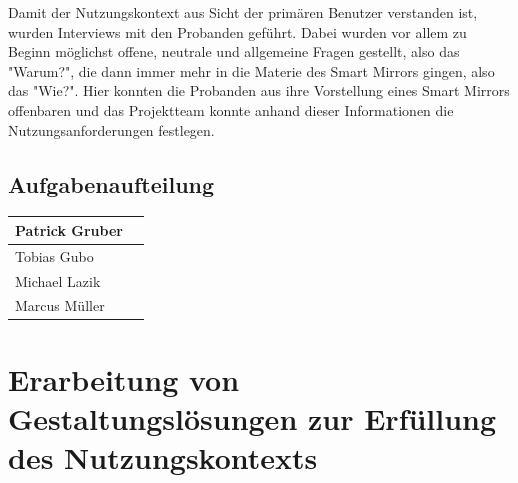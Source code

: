 \documentclass[12pt, a4paper]{scrartcl}
\begin{document}
	Damit der Nutzungskontext aus Sicht der primären Benutzer verstanden ist, wurden Interviews mit den Probanden geführt.
	Dabei wurden vor allem zu Beginn möglichst offene, neutrale und allgemeine Fragen gestellt, also das "Warum?", die dann immer mehr in die Materie des Smart Mirrors gingen, also das "Wie?". Hier konnten die Probanden aus ihre Vorstellung eines Smart Mirrors offenbaren und das Projektteam konnte anhand dieser Informationen die Nutzungsanforderungen festlegen. 
	

	
	
	\subsection*{Aufgabenaufteilung}
	\begin{tabularx}{0.95\textwidth}{|l|X|}
		\hline
		Patrick Gruber & \\
		\hline
		Tobias Gubo & \\
		\hline
		Michael Lazik & \\
		\hline
		Marcus Müller & \\
		\hline
	\end{tabularx}
	
	\newpage
	
	\section{Erarbeitung von Gestaltungslösungen zur Erfüllung des Nutzungskontexts}
\end{document}
